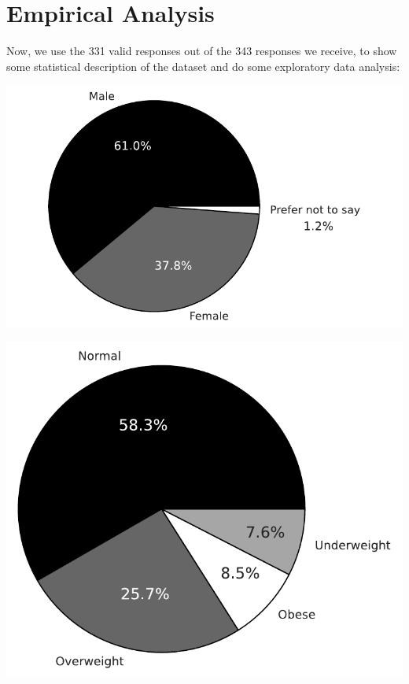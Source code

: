 \documentclass[a4paper,fleqn]{cas-sc}
\begin{document}
\section{Empirical Analysis}
Now, we use the 331 valid responses out of the 343 responses we receive, to show some statistical description of the dataset and do some exploratory data analysis:



\begin{minipage}{.5\textwidth}
\centering
  \includegraphics[width=.9\linewidth]{figs/gender_distribution.pdf}
  \label{fig:gender_distribution}
\end{minipage}%
\begin{minipage}{.5\textwidth}
\centering
  \includegraphics[width=.65\linewidth]{figs/bmi_distribution.pdf}
  \label{fig:bmi_distribution}
\end{minipage}
\end{document}
